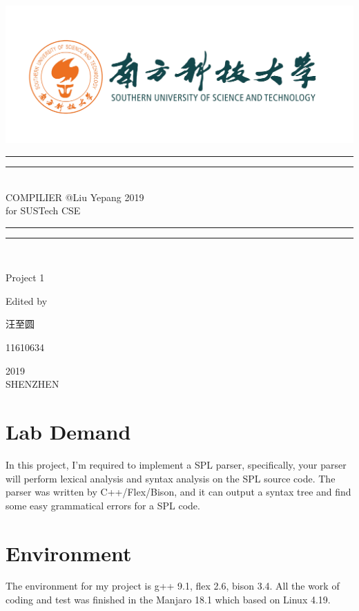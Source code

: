 \documentclass{article}
\begin{document}
 
    \begin{titlepage}       %
        \centering
        \includegraphics[width=\textwidth]{../SUSTC_LOGO.png}
        \rule{\textwidth}{1.6pt}\vspace*{-\baselineskip}\vspace*{2pt}
        \rule{\textwidth}{0.4pt}\\[\baselineskip]
        {\LARGE COMPILIER @Liu Yepang 2019\\[\baselineskip]\small for SUSTech CSE}
        \\[0.2\baselineskip]
        \rule{\textwidth}{0.4pt}\vspace*{-\baselineskip}\vspace{3.2pt}
        \rule{\textwidth}{1.6pt}\\[\baselineskip]
        \scshape
        \vspace*{\baselineskip}
        {\Large Project 1\par }
        Edited by \\[\baselineskip] {汪至圆\par}
        {\Large 11610634\par }
        \vfill
        {\scshape 2019} \\{\large SHENZHEN}\par
    \end{titlepage}

    \section{Lab Demand}
        In this project, I'm required to implement a SPL parser, specifically, your parser
    will perform lexical analysis and syntax analysis on the SPL source code. The parser was
    written by C++/Flex/Bison, and it can output a syntax tree and find some easy grammatical 
    errors for a SPL code.

    \section{Environment}
        The environment for my project is g++ 9.1, flex 2.6, bison 3.4. All the work of coding
        and test was finished in the Manjaro 18.1 which based on Linux 4.19.
    
\end{document}

